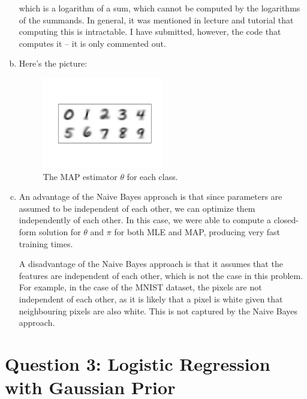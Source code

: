 \documentclass{article}
\begin{document}
\begin{enumerate}[(a)]
    which is a logarithm of a sum, which cannot be computed by the logarithms of the summands. In general, it was mentioned in lecture and tutorial that computing this is intractable. I have submitted, however, the code that computes it -- it is only commented out.

    \item Here's the picture:
    
    \begin{figure}[H]
        \centering
        \includegraphics[width=0.5\textwidth]{../code_and_data/map.png}
        \caption{The MAP estimator $\theta$ for each class.}
    \end{figure}

    \item An advantage of the Naive Bayes approach is that since parameters are assumed to be independent of each other, we can optimize them independently of each other. In this case, we were able to compute a closed-form solution for $\theta$ and $\pi$ for both MLE and MAP, producing very fast training times. 
    
    A disadvantage of the Naive Bayes approach is that it assumes that the features are independent of each other, which is not the case in this problem. For example, in the case of the MNIST dataset, the pixels are not independent of each other, as it is likely that a pixel is white given that neighbouring pixels are also white. This is not captured by the Naive Bayes approach. 

\end{enumerate}

\newpage 
\section*{Question 3: Logistic Regression with Gaussian Prior}
\end{document}
